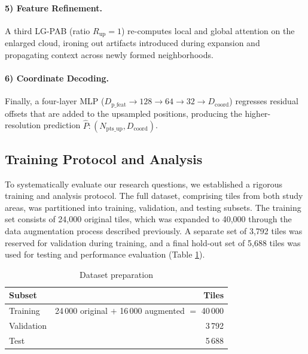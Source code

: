 \documentclass[remotesensing,article,submit,pdftex,moreauthors]{Definitions/mdpi}
\begin{document}
\paragraph{5) Feature Refinement.}
A third LG-PAB (ratio $R_{\text{up}}=1$) re-computes local and global attention on the enlarged cloud, ironing out artifacts introduced during expansion and propagating context across newly formed neighborhoods.

\paragraph{6) Coordinate Decoding.}
Finally, a four-layer MLP ($D_{\text{p\_feat}} \rightarrow 128 \rightarrow 64 \rightarrow 32 \rightarrow D_{\text{coord}}$) regresses residual offsets that are added to the upsampled positions, producing the higher-resolution prediction $\hat{P}: (N_{\text{pts\_up}}, D_{\text{coord}})$.

\subsection{Training Protocol and Analysis}
\label{sec:study_design}
To systematically evaluate our research questions, we established a rigorous training and analysis protocol. The full dataset, comprising tiles from both study areas, was partitioned into training, validation, and testing subsets. The training set consists of 24,000 original tiles, which was expanded to 40,000 through the data augmentation process described previously. A separate set of 3,792 tiles was reserved for validation during training, and a final hold-out set of 5,688 tiles was used for testing and performance evaluation (Table \ref{tab:data_prep}).
\begin{table}[htbp]
  \centering
  \caption{Dataset preparation}
  \label{tab:data_prep}
  \begin{tabular}{lr}
    \toprule
    \textbf{Subset} & \textbf{Tiles} \\
    \midrule
    Training        & 24\,000 original $+$ 16\,000 augmented $=$ 40\,000 \\
    Validation      & 3\,792 \\
    Test            & 5\,688 \\
    \bottomrule
  \end{tabular}
\end{table}
\end{document}
